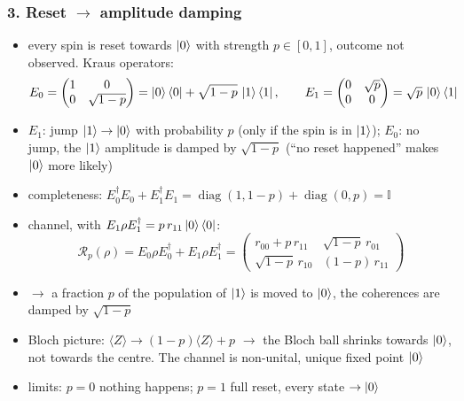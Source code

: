 \subsubsection*{3. Reset $\to$ amplitude damping}
\begin{itemize}
    \item every spin is reset towards $\ket{0}$ with strength $p \in [0, 1]$, outcome not observed. Kraus
    operators:
    \begin{equation*}
        E_0 = \begin{pmatrix} 1 & 0 \\ 0 & \sqrt{1-p} \end{pmatrix}
        = \ket{0}\bra{0} + \sqrt{1-p}\, \ket{1}\bra{1}, \qquad
        E_1 = \begin{pmatrix} 0 & \sqrt{p} \\ 0 & 0 \end{pmatrix} = \sqrt{p}\, \ket{0}\bra{1}
    \end{equation*}
    \item $E_1$: jump $\ket{1} \to \ket{0}$ with probability $p$ (only if the spin is in $\ket{1}$);
    $E_0$: no jump, the $\ket{1}$ amplitude is damped by $\sqrt{1-p}$ (``no reset happened'' makes
    $\ket{0}$ more likely)
    \item completeness: $E_0^\dagger E_0 + E_1^\dagger E_1 = \operatorname{diag}(1, 1-p) + \operatorname{diag}(0, p) = \mathbb{I}$
    \item channel, with $E_1 \rho E_1^\dagger = p\, r_{11} \ket{0}\bra{0}$:
    \begin{equation*}
        \mathcal{R}_p(\rho) = E_0 \rho E_0^\dagger + E_1 \rho E_1^\dagger
        = \begin{pmatrix} r_{00} + p\, r_{11} & \sqrt{1-p}\, r_{01} \\ \sqrt{1-p}\, r_{10} & (1-p)\, r_{11} \end{pmatrix}
    \end{equation*}
    \item $\to$ a fraction $p$ of the population of $\ket{1}$ is moved to $\ket{0}$, the coherences are damped
    by $\sqrt{1-p}$
    \item Bloch picture: $\langle Z \rangle \to (1-p)\langle Z \rangle + p$ $\to$ the Bloch ball shrinks
    towards $\ket{0}$, not towards the centre. The channel is non-unital, unique fixed point $\ket{0}$
    \item limits: $p = 0$ nothing happens; $p = 1$ full reset, every state $\to \ket{0}$
\end{itemize}

